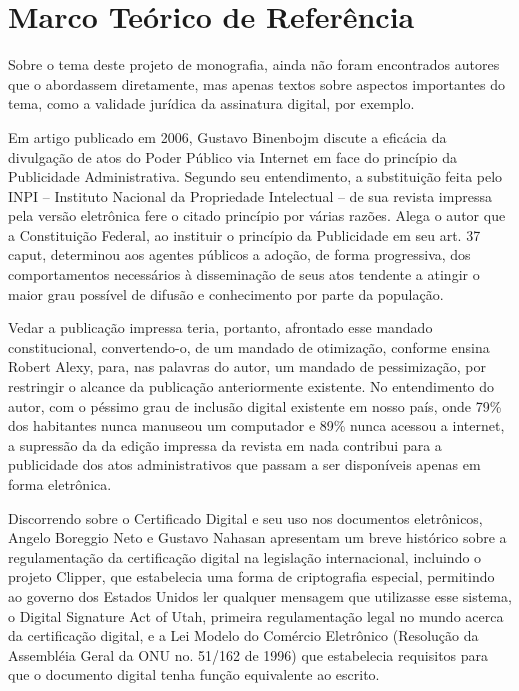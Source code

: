 \chapter{Marco Teórico de Referência}
	Sobre o tema deste projeto de monografia, ainda não foram encontrados autores que o abordassem diretamente, mas apenas textos sobre aspectos importantes do tema, como a validade jurídica da assinatura digital, por exemplo.\par
	
	Em artigo publicado em 2006, Gustavo Binenbojm discute a eficácia da divulgação de atos do Poder Público via Internet em face do princípio da Publicidade Administrativa. Segundo seu entendimento, a substituição feita pelo INPI – Instituto Nacional da Propriedade Intelectual – de sua revista impressa pela versão eletrônica fere o citado princípio por várias razões. Alega o autor que a Constituição Federal, ao instituir o princípio da Publicidade em seu art. 37 caput, determinou aos agentes públicos a adoção, de forma progressiva, dos comportamentos necessários à disseminação de seus atos tendente a atingir o maior grau possível de difusão e conhecimento por parte da população. \par
	
	Vedar a publicação impressa teria, portanto, afrontado esse mandado constitucional, convertendo-o, de um mandado de otimização, conforme ensina Robert Alexy, para, nas palavras do autor, um mandado de pessimização, por restringir o alcance da publicação anteriormente existente.  No entendimento do autor, com o péssimo grau de inclusão digital existente em nosso país, onde 79\% dos habitantes nunca manuseou um computador e 89\% nunca acessou a internet, a supressão da da edição impressa da revista em nada contribui para a publicidade dos atos administrativos que passam a ser disponíveis apenas em forma eletrônica. \par
	
	Discorrendo sobre o Certificado Digital e seu uso nos documentos eletrônicos, Angelo Boreggio Neto e Gustavo Nahasan apresentam um breve histórico sobre a regulamentação da certificação digital na legislação internacional, incluindo o projeto Clipper, que estabelecia uma forma de criptografia especial, permitindo ao governo dos Estados Unidos ler qualquer mensagem que utilizasse esse sistema, o Digital Signature Act of Utah, primeira regulamentação legal no mundo acerca da certificação digital, e a Lei Modelo do Comércio Eletrônico (Resolução da Assembléia Geral da ONU no. 51/162 de 1996) que estabelecia requisitos para que o documento digital tenha função equivalente ao escrito. \par
	
